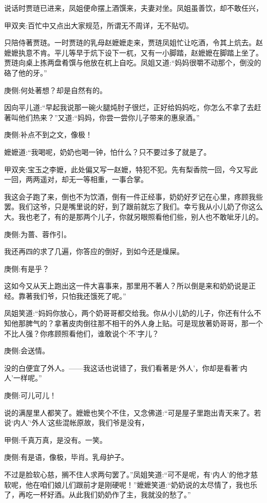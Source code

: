 \begin{parag}
    说话时贾琏已进来，凤姐便命摆上酒馔来，夫妻对坐。凤姐虽善饮，却不敢任兴，\begin{note}甲双夹:百忙中又点出大家规范，所谓无不周详，无不贴切。\end{note}只陪侍著贾琏。一时贾琏的乳母赵嬷嬷走来，贾琏凤姐忙让吃酒，令其上炕去。赵嬷嬷执意不肯。平儿等早于炕下设下一杌，又有一小脚踏，赵嬷嬷在脚踏上坐了。贾琏向桌上拣两盘肴馔与他放在杌上自吃。凤姐又道:“妈妈很嚼不动那个，倒没的硌了他的牙。”\begin{note}庚侧:何处著想？却是自然有的。\end{note}因向平儿道:“早起我说那一碗火腿炖肘子很烂，正好给妈妈吃，你怎么不拿了去赶著叫他们热来？”又道:“妈妈，你尝一尝你儿子带来的惠泉酒。”\begin{note}庚侧:补点不到之文，像极！\end{note}嬷嬷道:“我喝呢，奶奶也喝一钟，怕什么？只不要过多了就是了。\begin{note}甲双夹:宝玉之李嬷，此处偏又写一赵嬷，特犯不犯。先有梨香院一回，今又写此一回，两两遥对，却无一等相重，一事合掌。\end{note}我这会子跑了来，倒也不为饮酒，倒有一件正经事，奶奶好歹记在心里，疼顾我些罢。我们这爷，只是嘴里说的好，到了跟前就忘了我们。幸亏我从小儿奶了你这么大。我也老了，有的是那两个儿子，你就另眼照看他们些，别人也不敢呲牙儿的。\begin{note}庚侧:为蔷、蓉作引。\end{note}我还再四的求了几遍，你答应的倒好，到如今还是燥屎。\begin{note}庚侧:有是乎？\end{note}这如今又从天上跑出这一件大喜事来，那里用不著人？所以倒是来和奶奶说是正经。靠著我们爷，只怕我还饿死了呢。”
\end{parag}


\begin{parag}
    凤姐笑道:“妈妈你放心，两个奶哥哥都交给我。你从小儿奶的儿子，你还有什么不知他那脾气的？拿著皮肉倒往那不相干的外人身上贴。可是现放著奶哥哥，那一个不比人强？你疼顾照看他们，谁敢说个‘不’字儿？\begin{note}庚侧:会送情。\end{note}没的白便宜了外人。——我这话也说错了，我们看著是‘外人’，你却是看著‘内人’一样呢。”\begin{note}庚侧:可儿可儿！\end{note}说的满屋里人都笑了。嬷嬷也笑个不住，又念佛道:“可是屋子里跑出青天来了。若说‘内人’‘外人’这些混帐原故，我们爷是没有，\begin{note}甲侧:千真万真，是没有。一笑。\end{note}\begin{note}庚侧:有是语，像极，毕肖。乳母护子。\end{note}不过是脸软心慈，搁不住人求两句罢了。”凤姐笑道:“可不是呢，有‘内人’的他才慈软呢，他在咱们娘儿们跟前才是刚硬呢！”嬷嬷笑道:“奶奶说的太尽情了，我也乐了，再吃一杯好酒。从此我们奶奶作了主，我就没的愁了。”
\end{parag}


